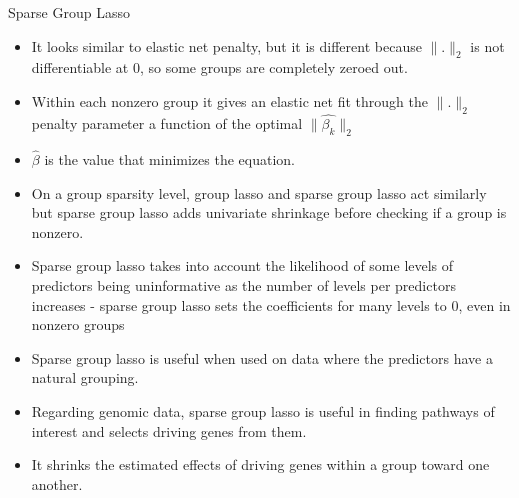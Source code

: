 \documentclass[8pt]{beamer}
\begin{document}
\begin{frame}{Sparse Group Lasso}
\begin{itemize}
    \item It looks similar to elastic net penalty, but it is different because $\|.\|_{2}$ is not differentiable at $0$, so some groups are completely zeroed out.
    \item Within each nonzero group it gives an elastic net fit through the $\|.\|_{2}$ penalty parameter a function of the optimal $\|\hat{\beta_{k}}\|_{2}$
    \item $\hat{\beta}$ is the value that minimizes the equation.
    \item On a group sparsity level, group lasso and sparse group lasso act similarly but sparse group lasso adds univariate shrinkage before checking if a group is nonzero.
    \item Sparse group lasso takes into account the likelihood of some levels of predictors being uninformative as the number of levels per predictors increases - sparse group lasso sets the coefficients for many levels to $0$, even in nonzero groups
    \item Sparse group lasso is useful when used on data where the predictors have a natural grouping.
    \item Regarding genomic data, sparse group lasso is useful in finding pathways of interest and selects driving genes from them. 
    \item It shrinks the estimated effects of driving genes within a group toward one another.
\end{itemize}
\end{frame}
\end{document}
